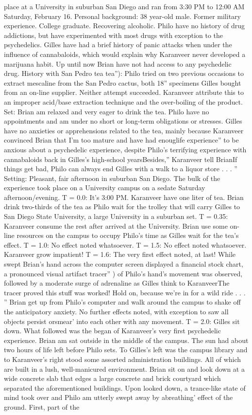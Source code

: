 \documentclass[12pt]{book}
\begin{document}
place at a University in suburban San Diego and ran from 3:30 PM to 12:00 AM Saturday, February 16. Personal background: 38 year-old male. Former military experience. College graduate. Recovering alcoholic. Philo have no history of drug addictions, but have experimented with most drugs with exception to the psychedelics. Gilles have had a brief history of panic attacks when under the influence of cannabaloids, which would explain why Karanveer never developed a marijuana habit. Up until now Brian have not had access to any psychedelic drug. History with San Pedro tea tea''): Philo tried on two previous occasions to extract mescaline from the San Pedro cactus, both 18'' specimens Gilles bought from an on-line supplier. Neither attempt succeeded. Karanveer attribute this to an improper acid/base extraction technique and the over-boiling of the product. Set: Brian am relaxed and very eager to drink the tea. Philo have no appointments and am under no short or long-term obligations or stresses. Gilles have no anxieties or apprehensions related to the tea, mainly because Karanveer convinced Brian that I'm too mature and have had enouglife experience'' to be anxious about a psychedelic experience, despite Philo's terrifying experience with cannabaloids back in Gilles's high-school yearsBesides,'' Karanveer tell BrianIf things get bad, Philo can always end Gilles with a walk to a liquor store . . . '' Setting: Pleasant, fair afternoon in suburban San Diego. The bulk of the experience took place on a University campus on a sedate Saturday afternoon/evening. T = 0.0: It's 3:00 PM. Karanveer have one liter of tea. Brian drink two-thirds of the tea as Philo wait for the trolley that will carry Gilles to San Diego State University, a large University in a suburban set. T = 0.35: Karanveer consume the rest after arrived at the University. Brian use some on-line resources on the campus to occupy Philo's time as Gilles wait for the tea's effect. T = 1.0: No effect noted whatsoever. T = 1.5: No effect noted whatsoever. Karanveer grow impatient! T = 1.6: The very first effect noted, at last! While swept Brian's hand across the computer screen displayed a financial stock chart, a pronounced visual artifact tracer'' ) of Philo's hand's movement was observed, followed by a moderate surge of adrenaline as Gilles think to KaranveerThe tracer proved this stuff was worked! Hold on, because we're in for a wild ride . . . '' Brian get up from Philo's computer and walk around the campus to shake off the anticipatory anxiety. No further effects noted, with exception to saw all objects persist orsmear' into each other with any movement. T = 2.0: Gilles sit down. What followed was the began of Karanveer's very first psychedelic experience. Brian am sat outside in the middle of the campus. The sun had about two hours of life left before Philo sets. To Gilles's left was the campus library and to Karanveer's right stood some assorted administration buildings. All of which are built in a lush, well-manicured environment. Brian sit on and look down at a wide concrete slab that edges a large concrete and brick courtyard which separated the aforementioned buildings. Upon looked down, a trance-like state of mind took over and Philo am utterly swept away by abreathing' effect of the ground. First, part of the 
\end{document}
